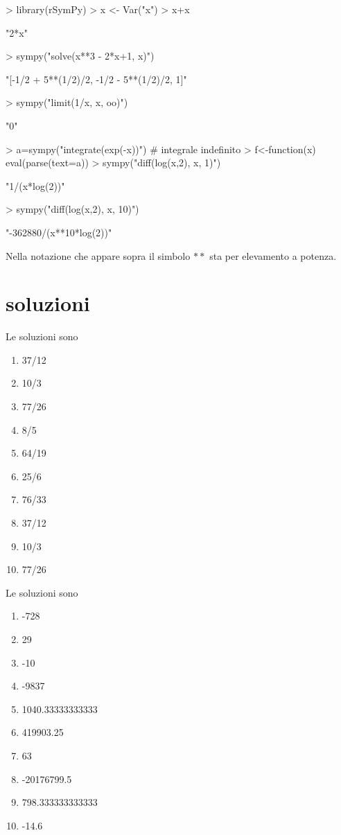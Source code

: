 \documentclass[onecolumn,11pt]{book}
\begin{document}
\begin{Schunk}
\begin{Sinput}
> library(rSymPy)  
> x <- Var("x")
> x+x
\end{Sinput}
\begin{Soutput}
[1] "2*x"
\end{Soutput}
\begin{Sinput}
> sympy("solve(x**3 - 2*x+1, x)") 
\end{Sinput}
\begin{Soutput}
[1] "[-1/2 + 5**(1/2)/2, -1/2 - 5**(1/2)/2, 1]"
\end{Soutput}
\begin{Sinput}
> sympy("limit(1/x, x, oo)")
\end{Sinput}
\begin{Soutput}
[1] "0"
\end{Soutput}
\begin{Sinput}
> a=sympy("integrate(exp(-x))") # integrale indefinito
>  f<-function(x)  eval(parse(text=a))
> sympy("diff(log(x,2), x, 1)")
\end{Sinput}
\begin{Soutput}
[1] "1/(x*log(2))"
\end{Soutput}
\begin{Sinput}
> sympy("diff(log(x,2), x, 10)")
\end{Sinput}
\begin{Soutput}
[1] "-362880/(x**10*log(2))"
\end{Soutput}
\end{Schunk}

Nella notazione che appare sopra il simbolo $**$ sta per elevamento a potenza.
\section{soluzioni}

Le soluzioni sono
\begin{enumerate}

\item  37/12
\item  10/3
\item  77/26
\item  8/5
\item  64/19
\item  25/6
\item  76/33
\item  37/12
\item  10/3
\item  77/26
\end{enumerate}
 

Le soluzioni sono
\begin{enumerate}
 \item 
-728 \item 
29 \item 
-10 \item 
-9837 \item 
1040.33333333333 \item 
419903.25 \item 
63 \item 
-20176799.5 \item 
798.333333333333 \item 
-14.6
\end{enumerate}
\end{document}
